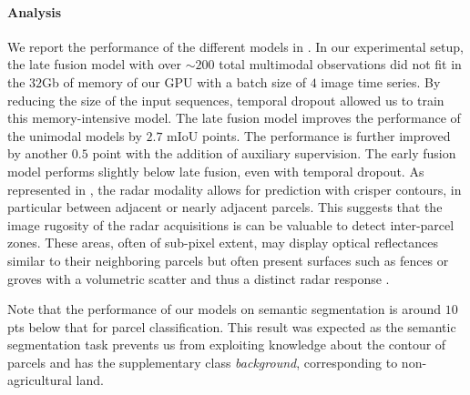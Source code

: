 \paragraph{\bf Analysis} We report the performance of the different models in . In our experimental setup, the late fusion model with {over} $\sim200$ total {multimodal} observations did not fit in {the $32$Gb of memory of our GPU} with a batch size of $4$ image time series. {By reducing the size of the input sequences, temporal dropout allowed us to  train this memory-intensive model.}
The late fusion model improves the performance of the unimodal models by $2.7$ mIoU points. The performance is further improved by {another} $0.5$ point with the addition of auxiliary supervision. {The early fusion model performs slightly below late fusion, even with temporal dropout. }
As represented in , the radar {modality allows for prediction with crisper contours, in particular between adjacent or nearly adjacent parcels}. This suggests that {the image rugosity}  {of the radar} acquisitions is {can be} valuable to detect inter-parcel zones. {These areas, often of sub-pixel extent,} may display optical reflectances {similar to their} neighboring parcels {but often present surfaces such as fences or groves with a volumetric scatter and thus a distinct radar response . }

Note that the performance of our models on semantic segmentation is around $10$pts below that for parcel classification. This result was expected as {the semantic segmentation task prevents us from exploiting knowledge about the contour of parcels and has the supplementary class \emph{background}, corresponding to non-agricultural land.}


